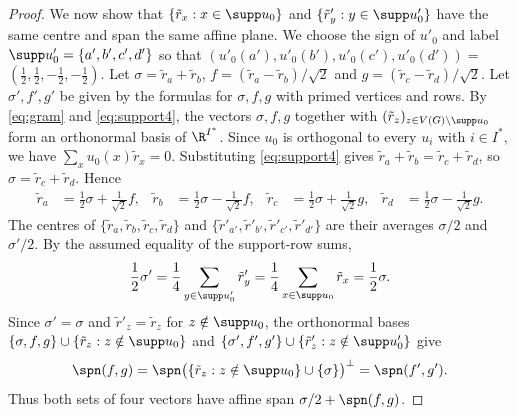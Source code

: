 \begin{proof}
  We now show that $\{\tilde{r}_x:x\in\supp u_0\}$ and
  $\{\tilde{r}'_y:y\in\supp u'_0\}$ have the same centre and span the
  same affine plane.
  We choose the sign of $u'_0$ and label
  $\supp u'_0=\{a',b',c',d'\}$ so that
  $(u'_0(a'),u'_0(b'),u'_0(c'),u'_0(d'))=$
  $(\tfrac12,\tfrac12,-\tfrac12,-\tfrac12)$.
  Let $\sigma = \tilde{r}_a + \tilde{r}_b$,
  $f = (\tilde{r}_a - \tilde{r}_b)/\sqrt{2}$ and
  $g = (\tilde{r}_c - \tilde{r}_d)/\sqrt{2}$.
  Let $\sigma',f',g'$ be given by the formulas for $\sigma,f,g$ with
  primed vertices and rows.
  By \cref{eq:gram} and
  \cref{eq:support4}, the vectors $\sigma,f,g$ together with
  $(\tilde{r}_z)_{z\in V(G)\setminus\supp u_0}$ form an orthonormal basis of
  $\R^{I^*}$. Since $u_0$ is orthogonal to every $u_i$ with $i\in I^*$,
  we have $\sum_xu_0(x)\tilde{r}_x=0$.
  Substituting \cref{eq:support4} gives
  $\tilde{r}_a+\tilde{r}_b=\tilde{r}_c+\tilde{r}_d$, so $\sigma=\tilde{r}_c+\tilde{r}_d$. Hence
  \begin{equation}
    \label{eq:special-rows}
    \begin{aligned}
    \tilde{r}_a &= \frac{1}{2} \sigma + \frac{1}{\sqrt{2}} f, &
    \tilde{r}_b &= \frac{1}{2} \sigma - \frac{1}{\sqrt{2}} f, &
    \tilde{r}_c &= \frac{1}{2} \sigma + \frac{1}{\sqrt{2}} g, &
    \tilde{r}_d &= \frac{1}{2} \sigma - \frac{1}{\sqrt{2}} g.
    \end{aligned}
  \end{equation}
  The centres of $\{\tilde{r}_a,\tilde{r}_b,\tilde{r}_c,\tilde{r}_d\}$ and
  $\{\tilde{r}'_{a'},\tilde{r}'_{b'},\tilde{r}'_{c'},\tilde{r}'_{d'}\}$ are their averages
  $\sigma/2$ and $\sigma'/2$. By the assumed equality of the support-row sums,
  \begin{equation}\label{eq:quartet-offset}
    \frac12\sigma'=\frac14\sum_{y\in\supp u'_0}\tilde{r}'_y
    =\frac14\sum_{x\in\supp u_0}\tilde{r}_x=\frac12\sigma.
  \end{equation}
  Since $\sigma'=\sigma$ and $\tilde{r}'_z=\tilde{r}_z$ for
  $z\notin\supp u_0$, the orthonormal bases
  $\{\sigma,f,g\}\cup\{\tilde{r}_z:z\notin\supp u_0\}$ and
  $\{\sigma',f',g'\}\cup\{\tilde{r}'_z:z\notin\supp u'_0\}$ give
  \begin{equation}\label{eq:quartet-plane}
   \spn(f,g)
   =\spn\bigl(\{\tilde{r}_z:z\notin\supp u_0\}\cup\{\sigma\}\bigr)^\perp
   =\spn(f',g').
  \end{equation}
  Thus both sets of four vectors have affine span $\sigma/2+\spn(f,g)$.


\end{proof}
